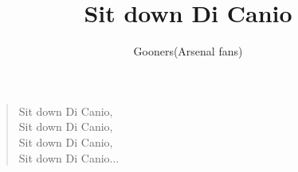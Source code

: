 \documentclass[a4paper,12pt]{article}
\title{Sit down Di Canio}
\author{Gooners(Arsenal fans)}
\date{}
\begin{document}
	
	\maketitle
	
	\begin{verse}
		
		Sit down Di Canio, \\
		Sit down Di Canio, \\
		Sit down Di Canio, \\
		Sit down Di Canio$\ldots$
		
	\end{verse}
	
\end{document}
